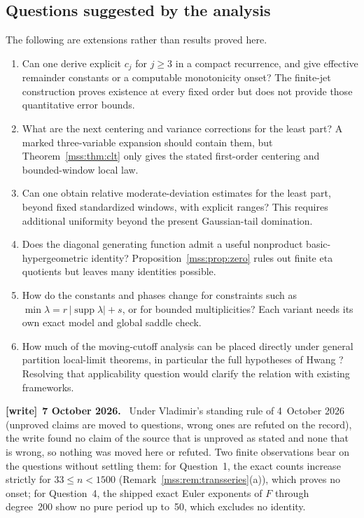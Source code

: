 \documentclass[11pt,letterpaper]{article}
\numberwithin{equation}{section}
\theoremstyle{definition}\newtheorem{definition}[theorem]{Definition}
\theoremstyle{remark}\newtheorem{remark}[theorem]{Remark}
\newenvironment{writenote}[1][]{\par\smallskip\begingroup\small
 \noindent\textbf{[write]}\if\relax\detokenize{#1}\relax\else~\textbf{#1.}\fi\ }%
 {\par\endgroup\smallskip}
\begin{document}
\subsection{Questions suggested by the analysis}\label{mss:sec:questions}
The following are extensions rather than results proved here.
\begin{enumerate}[leftmargin=*,itemsep=4pt]
\item Can one derive explicit $c_j$ for $j\ge3$ in a compact recurrence, and give effective remainder constants or a computable monotonicity onset? The finite-jet construction proves existence at every fixed order but does not provide those quantitative error bounds.
\item What are the next centering and variance corrections for the least part? A marked three-variable expansion should contain them, but Theorem~\ref{mss:thm:clt} only gives the stated first-order centering and bounded-window local law.
\item Can one obtain relative moderate-deviation estimates for the least part, beyond fixed standardized windows, with explicit ranges? This requires additional uniformity beyond the present Gaussian-tail domination.
\item Does the diagonal generating function admit a useful nonproduct basic-hypergeometric identity? Proposition~\ref{mss:prop:zero} rules out finite eta quotients but leaves many identities possible.
\item How do the constants and phases change for constraints such as $\min\lambda=r\,|\operatorname{supp}\lambda|+s$, or for bounded multiplicities? Each variant needs its own exact model and global saddle check.
\item How much of the moving-cutoff analysis can be placed directly under general partition local-limit theorems, in particular the full hypotheses of Hwang \cite{hwang}? Resolving that applicability question would clarify the relation with existing frameworks.
\end{enumerate}
\begin{writenote}[7 October 2026]
Under Vladimir's standing rule of 4~October 2026 (unproved claims are moved
to questions, wrong ones are refuted on the record), the write found no claim
of the source that is unproved as stated and none that is wrong, so nothing
was moved here or refuted. Two finite observations bear on the questions
without settling them: for Question~1, the exact counts increase strictly for
$33\le n<1500$ (Remark~\ref{mss:rem:transseries}(a)), which proves no onset;
for Question~4, the shipped exact Euler exponents of $F$ through degree~200
show no pure period up to~50, which excludes no identity.
\end{writenote}
\end{document}
